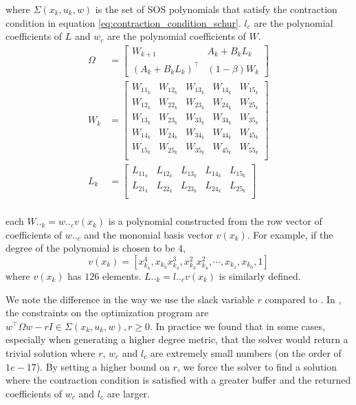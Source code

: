 \documentclass[conference]{IEEEtran}
\begin{document}
where $\Sigma(x_k, u_k, w)$ is the set of SOS polynomials that satisfy the contraction condition in equation \ref{eq:contraction_condition_schur}. $l_c$ are the polynomial coefficients of $L$ and $w_c$ are the polynomial coefficients of $W$.
\begin{equation} 
	\begin{aligned}
	\Omega &=
	\begin{bmatrix}
		W_{k+1} & A_k + B_k L_k \\
		(A_k + B_k L_k)^\top & (1 - \beta) W_k
	\end{bmatrix} \\
	W_k &= 
	\begin{bmatrix}
		W_{11_k} & W_{12_k} & W_{13_k} & W_{14_k} & W_{15_k} \\
		W_{12_k} & W_{22_k} & W_{23_k} & W_{24_k} & W_{25_k} \\
		W_{13_k} & W_{23_k} & W_{33_k} & W_{34_k} & W_{35_k} \\
		W_{14_k} & W_{24_k} & W_{34_k} & W_{44_k} & W_{45_k} \\
		W_{15_k} & W_{25_k} & W_{35_k} & W_{45_k} & W_{55_k} \\
	\end{bmatrix} \\
	L_k &=
	\begin{bmatrix}
		L_{11_k} & L_{12_k} & L_{13_k} & L_{14_k} & L_{15_k} \\
		L_{21_k} & L_{22_k} & L_{23_k} & L_{24_k} & L_{25_k} \\
	\end{bmatrix} \\
	\end{aligned}
\end{equation}

each $W.._{k} = w.._c v(x_k)$ is a polynomial constructed from the row vector of coefficients of $w.._c$ and the monomial basis vector $v(x_k)$. For example, if the degree of the polynomial is chosen to be $4$,
\begin{equation}
	v(x_k) = [x^4_{k_4}, x_{k_3}x^3_{k_4}, x^2_{k_3}x^2_{k_4}, \cdots ,x_{k_1}, x_{k_0}, 1]
\end{equation}
where $v(x_k)$ has $126$ elements. $L.._k = l.._c v(x_k)$ is similarly defined.

We note the difference in the way we use the slack variable $r$ compared to \autocite{weiControlContractionMetric2021}. In \autocite{weiControlContractionMetric2021}, the constraints on the optimization program are $w^\top \Omega w - r I \in \Sigma(x_k, u_k, w), r \geq 0$. In practice we found that in some cases, especially when generating a higher degree metric, that the solver would return a trivial solution where $r$, $w_c$ and $l_c$ are extremely small numbers (on the order of $1e-17$). By setting a higher bound on $r$, we force the solver to find a solution where the contraction condition is satisfied with a greater buffer and the returned coefficients of $w_c$ and $l_c$ are larger.
\end{document}
